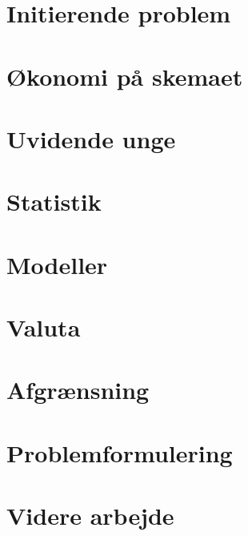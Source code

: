 


  \frame{\titlepage}
  
  \section{Initierende problem}
  
  
  \section{Økonomi på skemaet}
  
  
  \section{Uvidende unge}
  
  
  \section{Statistik}
  
  
  \section{Modeller}
  
  
  \section{Valuta}
  
  
  \section{Afgrænsning}
  
  
  \section{Problemformulering}
  
  
  \section{Videre arbejde}
  
  
  \closerslide{}
  
